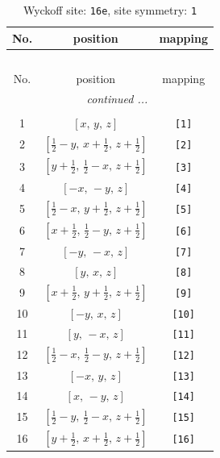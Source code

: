 \documentclass[fleqn,8pt]{jsarticle}
\begin{document}
\begin{longtable}{ccc}
\caption{Wyckoff site: {\tt 16e}, site symmetry: {\tt 1}}
 \\
 \hline \hline
No. & position & mapping \\ \hline \endfirsthead

\multicolumn{2}{l}{\tablename\ \thetable{}} \\
 \hline \hline
No. & position & mapping \\ \hline \endhead

 \hline \hline
\multicolumn{2}{r}{\footnotesize\it continued ...} \\ \endfoot

 \hline \hline
\multicolumn{2}{r}{} \\ \endlastfoot

1 & $\left[ x,\, y,\, z \right]$ & {\tt [1]} \\ \hline
2 & $\left[ \frac{1}{2} - y,\, x + \frac{1}{2},\, z + \frac{1}{2} \right]$ & {\tt [2]} \\ \hline
3 & $\left[ y + \frac{1}{2},\, \frac{1}{2} - x,\, z + \frac{1}{2} \right]$ & {\tt [3]} \\ \hline
4 & $\left[ - x,\, - y,\, z \right]$ & {\tt [4]} \\ \hline
5 & $\left[ \frac{1}{2} - x,\, y + \frac{1}{2},\, z + \frac{1}{2} \right]$ & {\tt [5]} \\ \hline
6 & $\left[ x + \frac{1}{2},\, \frac{1}{2} - y,\, z + \frac{1}{2} \right]$ & {\tt [6]} \\ \hline
7 & $\left[ - y,\, - x,\, z \right]$ & {\tt [7]} \\ \hline
8 & $\left[ y,\, x,\, z \right]$ & {\tt [8]} \\ \hline
9 & $\left[ x + \frac{1}{2},\, y + \frac{1}{2},\, z + \frac{1}{2} \right]$ & {\tt [9]} \\ \hline
10 & $\left[ - y,\, x,\, z \right]$ & {\tt [10]} \\ \hline
11 & $\left[ y,\, - x,\, z \right]$ & {\tt [11]} \\ \hline
12 & $\left[ \frac{1}{2} - x,\, \frac{1}{2} - y,\, z + \frac{1}{2} \right]$ & {\tt [12]} \\ \hline
13 & $\left[ - x,\, y,\, z \right]$ & {\tt [13]} \\ \hline
14 & $\left[ x,\, - y,\, z \right]$ & {\tt [14]} \\ \hline
15 & $\left[ \frac{1}{2} - y,\, \frac{1}{2} - x,\, z + \frac{1}{2} \right]$ & {\tt [15]} \\ \hline
16 & $\left[ y + \frac{1}{2},\, x + \frac{1}{2},\, z + \frac{1}{2} \right]$ & {\tt [16]} \\
\end{longtable}
\end{document}
